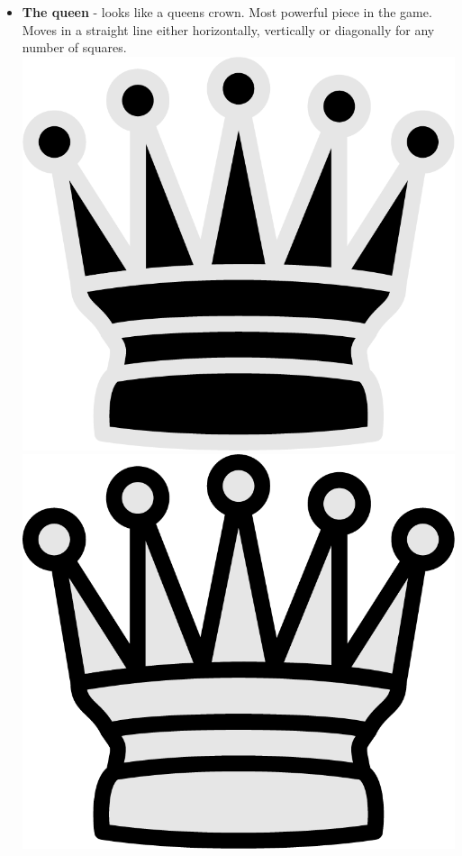 \documentclass{article}
\begin{document}
\begin{itemize}
    \item \textbf{The queen} - looks like a queens crown. Most powerful piece in the game. Moves in a straight line either horizontally, vertically or diagonally for any number of squares.\\
    \includegraphics[scale=0.1]{image14.png}
    \includegraphics[scale=0.1]{image4.png}
    

\end{itemize}
\end{document}
